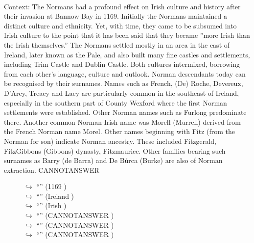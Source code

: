 \documentclass[11pt,a4paper, onecolumn]{article}
\begin{document}
\\ Context: The Normans had a profound effect on Irish culture and history after their invasion at Bannow Bay in 1169. Initially the Normans maintained a distinct culture and ethnicity. Yet, with time, they came to be subsumed into Irish culture to the point that it has been said that they became ''more Irish than the Irish themselves.'' The Normans settled mostly in an area in the east of Ireland, later known as the Pale, and also built many fine castles and settlements, including Trim Castle and Dublin Castle. Both cultures intermixed, borrowing from each other's language, culture and outlook. Norman descendants today can be recognised by their surnames. Names such as French, (De) Roche, Devereux, D'Arcy, Treacy and Lacy are particularly common in the southeast of Ireland, especially in the southern part of County Wexford where the first Norman settlements were established. Other Norman names such as Furlong predominate there. Another common Norman-Irish name was Morell (Murrell) derived from the French Norman name Morel. Other names beginning with Fitz (from the Norman for son) indicate Norman ancestry. These included Fitzgerald, FitzGibbons (Gibbons) dynasty, Fitzmaurice. Other families bearing such surnames as Barry (de Barra) and De Búrca (Burke) are also of Norman extraction. CANNOTANSWER

\begin{figure}[t] \small \begin{tcolorbox}[boxsep=0pt,left=5pt,right=0pt,top=2pt,colback = yellow!5] \begin{dialogue}
 \small 
\colorbox{pink!25}{$\hookrightarrow$}
{ ``'' (1169 ) }
\\
\colorbox{pink!25}{$\hookrightarrow$}
{ ``'' (Ireland ) }
\\
\colorbox{pink!25}{$\hookrightarrow$}
{ ``'' (Irish ) }
\\
\colorbox{pink!25}{$\hookrightarrow$}
{ ``'' (CANNOTANSWER ) }
\\
\colorbox{pink!25}{$\hookrightarrow$}
{ ``'' (CANNOTANSWER ) }
\\
\colorbox{pink!25}{$\hookrightarrow$}
{ ``'' (CANNOTANSWER ) }
\\
 \end{dialogue}\end{tcolorbox}\end{figure}
\end{document}
